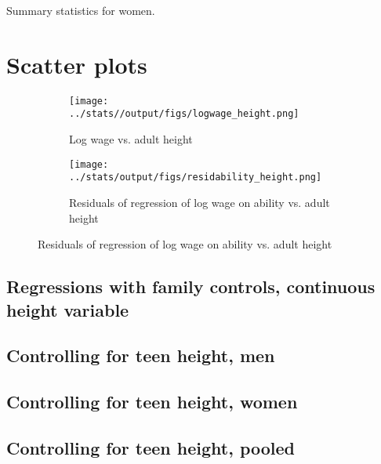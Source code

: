 \documentclass{article}
\begin{document}
\begin{table}[h]
\label{tab:summary_women}
\caption{Summary statistics for women.}

\end{table}

\clearpage

\section{Scatter plots}
\begin{figure}[htbp]
	\centering
	\begin{subfigure}[b]{\textwidth}
		\centering
		\texttt{[image: ../stats//output/figs/logwage\_height.png]}	
		\label{fig:logwageheight}
		\caption{Log wage vs. adult height}
	\end{subfigure}

	\begin{subfigure}[b]{\textwidth}
		\centering
		\texttt{[image: ../stats/output/figs/residability\_height.png]}	
		\label{fig:residabilityheight}
		\caption{Residuals of regression of log wage on ability vs. adult height}
	\end{subfigure}
\end{figure}

\clearpage

\begin{landscape}
\section{Regressions with family controls, continuous height variable}
\subsection{Controlling for teen height, men}

\end{landscape}

\begin{landscape}
\subsection{Controlling for teen height, women}

\end{landscape}

\begin{landscape}
\subsection{Controlling for teen height, pooled}

\end{landscape}
\end{document}
